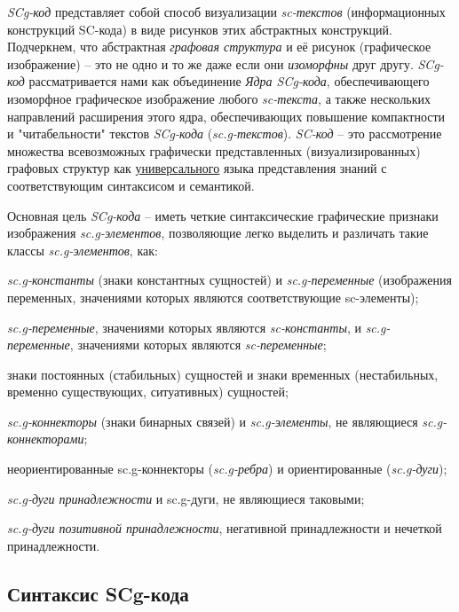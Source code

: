 \textit{SCg-код} представляет собой способ визуализации \textit{sc-текстов} (информационных конструкций SC-кода) в виде рисунков этих абстрактных конструкций. Подчеркнем, что абстрактная \textit{графовая структура} и её рисунок (графическое изображение) -- это не одно и то же даже если они \textit{изоморфны} друг другу. \mbox{\textit{SCg-код}} рассматривается нами как объединение \textit{Ядра SCg-кода}, обеспечивающего изоморфное графическое изображение любого \textit{sc-текста}, а также нескольких направлений расширения этого ядра, обеспечивающих повышение компактности и "читабельности"{} текстов \textit{SCg-кода} (\textit{sc.g-текстов}).
\textit{SC-код} -- это рассмотрение множества всевозможных графически представленных (визуализированных) графовых структур как \underline{универсального} языка представления знаний с соответствующим синтаксисом и семантикой.

Основная цель \textit{SCg-кода} -- иметь четкие синтаксические графические признаки изображения \textit{sc.g-элементов}, позволяющие легко выделить и различать такие классы \textit{sc.g-элементов}, как:
\begin{textitemize}
	\item \textit{sc.g-константы} (знаки константных сущностей) и \textit{sc.g-переменные} (изображения переменных, значениями которых являются соответствующие sc-элементы);
	\item \textit{sc.g-переменные}, значениями которых являются \textit{sc-константы}, и \textit{sc.g-переменные}, значениями которых являются \textit{sc-переменные};
	\item знаки постоянных (стабильных) сущностей и знаки временных (нестабильных, временно существующих, ситуативных) сущностей;
	\item \textit{sc.g-коннекторы} (знаки бинарных связей) и \textit{sc.g-элементы}, не являющиеся \textit{sc.g-коннекторами};
	\item неориентированные sc.g-коннекторы (\textit{sc.g-ребра}) и ориентированные (\textit{sc.g-дуги});
	\item \textit{sc.g-дуги принадлежности} и sc.g-дуги, не являющиеся таковыми;
	\item \textit{sc.g-дуги позитивной принадлежности}, негативной принадлежности и нечеткой принадлежности.
\end{textitemize}


\subsection{Синтаксис SCg-кода}

